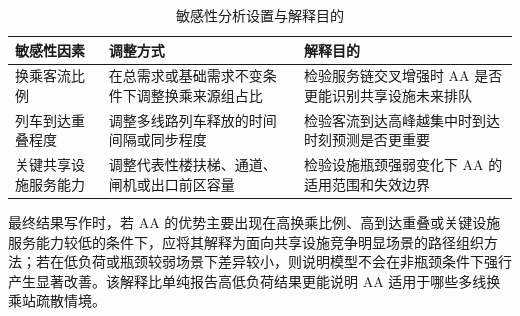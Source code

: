 \documentclass[UTF8,a4paper,12pt]{ctexart}
\begin{document}
\begin{table}[htbp]
\centering
\caption{敏感性分析设置与解释目的}
\small
\begin{tabular}{p{}p{}p{}}
\toprule
敏感性因素 & 调整方式 & 解释目的 \\
\midrule
换乘客流比例 & 在总需求或基础需求不变条件下调整换乘来源组占比 & 检验服务链交叉增强时 AA 是否更能识别共享设施未来排队 \\
列车到达重叠程度 & 调整多线路列车释放的时间间隔或同步程度 & 检验客流到达高峰越集中时到达时刻预测是否更重要 \\
关键共享设施服务能力 & 调整代表性楼扶梯、通道、闸机或出口前区容量 & 检验设施瓶颈强弱变化下 AA 的适用范围和失效边界 \\
\bottomrule
\end{tabular}
\end{table}

最终结果写作时，若 AA 的优势主要出现在高换乘比例、高到达重叠或关键设施服务能力较低的条件下，应将其解释为面向共享设施竞争明显场景的路径组织方法；若在低负荷或瓶颈较弱场景下差异较小，则说明模型不会在非瓶颈条件下强行产生显著改善。该解释比单纯报告高低负荷结果更能说明 AA 适用于哪些多线换乘站疏散情境。
\end{document}
